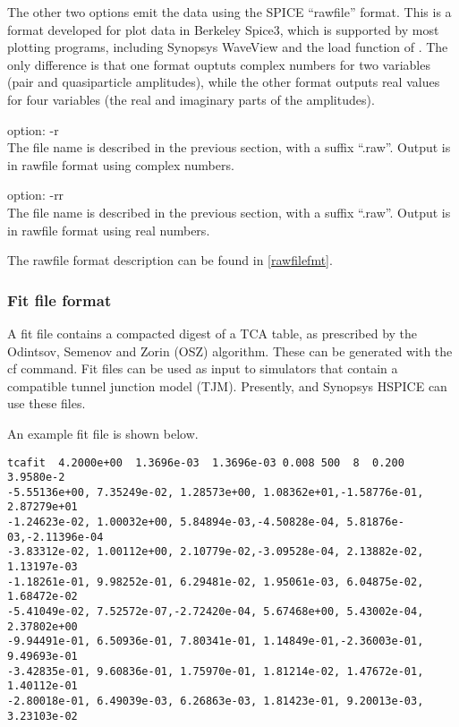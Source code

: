 {The other two options emit the data using the SPICE ``rawfile''
format.  This is a format developed for plot data in Berkeley Spice3,
which is supported by most plotting programs, including Synopsys
WaveView and the {\cb load} function of {\WRspice}.  The only
difference is that one format ouptuts complex numbers for two
variables (pair and quasiparticle amplitudes), while the other format
outputs real values for four variables (the real and imaginary parts
of the amplitudes).

\begin{description}
\item{option: {\vt -r}}\\
The file name is described in the previous section, with a suffix
``{\vt .raw}''.  Output is in rawfile format using complex numbers.

\item{option: {\vt -rr}}\\
The file name is described in the previous section, with a suffix
``{\vt .raw}''.  Output is in rawfile format using real numbers.
\end{description}

The rawfile format description can be found in \ref{rawfilefmt}.

\subsubsection{Fit file format}

A fit file contains a compacted digest of a TCA table, as prescribed
by the Odintsov, Semenov and Zorin (OSZ) algorithm.  These can be
generated with the {\vt cf} command.  Fit files can be used as input
to simulators that contain a compatible tunnel junction model (TJM). 
Presently, {\WRspice} and Synopsys HSPICE can use these files.

An example fit file is shown below.

\begin{verbatim}
tcafit  4.2000e+00  1.3696e-03  1.3696e-03 0.008 500  8  0.200 3.9580e-2
-5.55136e+00, 7.35249e-02, 1.28573e+00, 1.08362e+01,-1.58776e-01, 2.87279e+01
-1.24623e-02, 1.00032e+00, 5.84894e-03,-4.50828e-04, 5.81876e-03,-2.11396e-04
-3.83312e-02, 1.00112e+00, 2.10779e-02,-3.09528e-04, 2.13882e-02, 1.13197e-03
-1.18261e-01, 9.98252e-01, 6.29481e-02, 1.95061e-03, 6.04875e-02, 1.68472e-02
-5.41049e-02, 7.52572e-07,-2.72420e-04, 5.67468e+00, 5.43002e-04, 2.37802e+00
-9.94491e-01, 6.50936e-01, 7.80341e-01, 1.14849e-01,-2.36003e-01, 9.49693e-01
-3.42835e-01, 9.60836e-01, 1.75970e-01, 1.81214e-02, 1.47672e-01, 1.40112e-01
-2.80018e-01, 6.49039e-03, 6.26863e-03, 1.81423e-01, 9.20013e-03, 3.23103e-02
\end{verbatim}

}
